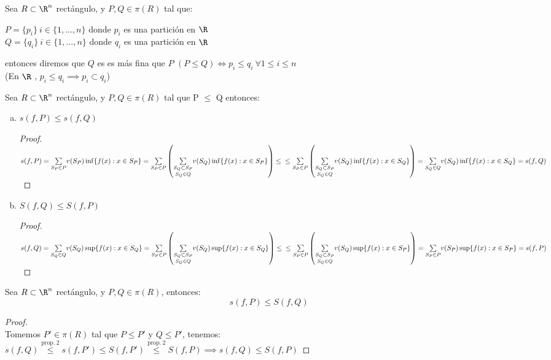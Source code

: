 	\begin{defi} Sea $R\subset \R^n$ rectángulo, y $P,Q\in\pi(R)$ tal que:
	 \begin{center}
	 $P =\{p_i\}\  i\in\{1,...,n\} $ donde $p_i$ es una partición en $\R$  \\
	 $Q =\{q_i\}\ i\in\{1,...,n\} $ donde $q_i$ es una partición en $\R$  \\
	 \end{center}
	 entonces diremos que $Q$ es es más fina que $P$ $(P \leq Q)\iff p_i \leq q_i\ \forall 1\leq i\leq n$ \\ 
	 (En $\R$ , $p_i \leq q_i \implies p_i \subset q_i$)
	\end{defi}
	
	
	\begin{proposicion}
	Sea $R\subset \R^n$ rectángulo, y $P,Q\in\pi(R)$ tal que P $\leq$ Q entonces:
	\begin{enumerate}[a)]
	\item $s(f,P) \leq s(f,Q)$
		\begin{proof}\ \\
		$s(f,P)=\underset{S_P\in P}\sum v(S_P)\inf\{f(x):x\in S_P\}=\underset{S_P\in P}\sum\left(\underset{S_Q\in Q}{\underset{S_Q\subset S_P}\sum} v(S_Q)\inf\{f(x):x\in S_P\}\right)\leq\\\leq \underset{S_P\in P}\sum\left(\underset{S_Q\in Q}{\underset{S_Q\subset S_P}\sum} v(S_Q)\inf\{f(x):x\in S_Q\}\right)=\underset{S_Q\in Q}\sum v(S_Q)\inf\{f(x):x\in S_Q\}=s(f,Q)$
		\end{proof}
	\item $S(f,Q) \leq S(f,P)$
		\begin{proof}\ \\
	$s(f,Q)=\underset{S_Q\in Q}\sum v(S_Q)\sup\{f(x):x\in S_Q\}=\underset{S_P\in P}\sum\left(\underset{S_Q\in Q}{\underset{S_Q\subset S_P}\sum} v(S_Q)\sup\{f(x):x\in S_Q\}\right)\leq\\\leq \underset{S_P\in P}\sum\left(\underset{S_Q\in Q}{\underset{S_Q\subset S_P}\sum} v(S_Q)\sup\{f(x):x\in S_P\}\right)=\underset{S_P\in P}\sum v(S_P)\sup\{f(x):x\in S_P\}=s(f,P)$
		\end{proof}
	\end{enumerate}
	\end{proposicion}
	
	\begin{proposicion} Sea $R\subset \R^n$ rectángulo, y $P,Q\in\pi(R)$, entonces: 
	\[s(f,P)\leq S(f,Q)\]
	\begin{proof}\ \\
	Tomemos $P'\in\pi(R)$ tal que $P \leq P'$ y $ Q \leq P'$, tenemos:\\
	$s(f,Q) \overset{\mathrm{prop.\ 2}}\leq s(f,P') \leq S(f,P') \overset{\mathrm{prop.\ 2}}\leq S(f,P) \implies s(f,Q) \leq S(f,P)$
	\end{proof}
	\end{proposicion}
	
